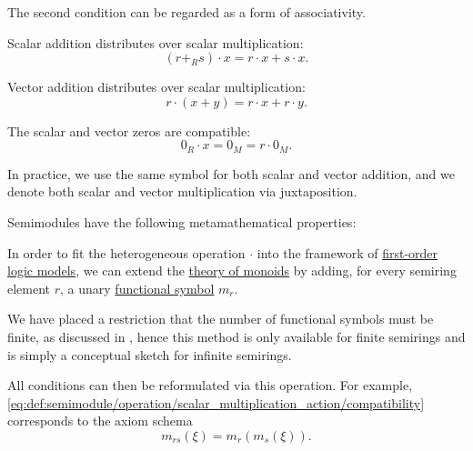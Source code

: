 \begin{definition}
\begin{thmenum}[series=def:semimodule]
\begin{thmenum}
      The second condition can be regarded as a form of associativity.

       Scalar addition distributes over scalar multiplication:
      \begin{equation}\label{eq:def:semimodule/operation/scalar_addition_distributivity}
        (r +_R s) \cdot x = r \cdot x + s \cdot x.
      \end{equation}

       Vector addition distributes over scalar multiplication:
      \begin{equation}\label{eq:def:semimodule/operation/vector_addition_distributivity}
        r \cdot (x + y) = r \cdot x + r \cdot y.
      \end{equation}

       The scalar and vector zeros are compatible:
      \begin{equation}\label{eq:def:semimodule/operation/absorption}
        0_R \cdot x = 0_M = r \cdot 0_M.
      \end{equation}
    \end{thmenum}

    In practice, we use the same symbol for both scalar and vector addition, and we denote both scalar and vector multiplication via juxtaposition.
  \end{thmenum}

  Semimodules have the following metamathematical properties:
  \begin{thmenum}[resume=def:semimodule]
     In order to fit the heterogeneous operation \( \cdot \) into the framework of \hyperref[def:first_order_model]{first-order logic models}, we can extend the \hyperref[def:monoid/theory]{theory of monoids} by adding, for every semiring element \( r \), a unary \hyperref[def:first_order_language/fun]{functional symbol} \( m_r \).

    We have placed a restriction that the number of functional symbols must be finite, as discussed in , hence this method is only available for finite semirings and is simply a conceptual sketch for infinite semirings.

    All conditions can then be reformulated via this operation. For example, \eqref{eq:def:semimodule/operation/scalar_multiplication_action/compatibility} corresponds to the axiom schema
    \begin{equation*}
      m_{rs}(\xi) = m_r(m_s(\xi)).
    \end{equation*}


\end{thmenum}
\end{definition}
